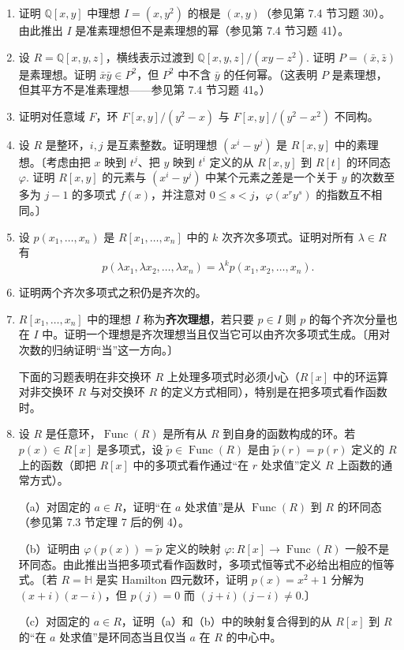 \begin{enumerate}
\item 证明 \(\mathbb{Q}[x, y]\) 中理想 \(I = (x, y^2)\) 的根是 \((x, y)\)（参见第 7.4 节习题 30）。由此推出 \(I\) 是准素理想但不是素理想的幂（参见第 7.4 节习题 41）。

\item 设 \(R = \mathbb{Q}[x, y, z]\)，横线表示过渡到 \(\mathbb{Q}[x, y, z]/(xy - z^2)\). 证明 \(P = (\bar{x}, \bar{z})\) 是素理想。证明 \(\bar{x}\bar{y} \in P^2\)，但 \(P^2\) 中不含 \(\bar{y}\) 的任何幂。（这表明 \(P\) 是素理想，但其平方不是准素理想——参见第 7.4 节习题 41。）

\item 证明对任意域 \(F\)，环 \(F[x, y]/(y^2 - x)\) 与 \(F[x, y]/(y^2 - x^2)\) 不同构。

\item 设 \(R\) 是整环，\(i, j\) 是互素整数。证明理想 \((x^i - y^j)\) 是 \(R[x, y]\) 中的素理想。〔考虑由把 \(x\) 映到 \(t^j\)、把 \(y\) 映到 \(t^i\) 定义的从 \(R[x, y]\) 到 \(R[t]\) 的环同态 \(\varphi\). 证明 \(R[x, y]\) 的元素与 \((x^i - y^j)\) 中某个元素之差是一个关于 \(y\) 的次数至多为 \(j-1\) 的多项式 \(f(x)\)，并注意对 \(0 \leq s < j\)，\(\varphi(x^r y^s)\) 的指数互不相同。〕

\item 设 \(p(x_1, \ldots, x_n)\) 是 \(R[x_1, \ldots, x_n]\) 中的 \(k\) 次齐次多项式。证明对所有 \(\lambda \in R\) 有
\[
p(\lambda x_1, \lambda x_2, \ldots, \lambda x_n) = \lambda^k p(x_1, x_2, \ldots, x_n).
\]

\item 证明两个齐次多项式之积仍是齐次的。

\item \(R[x_1, \ldots, x_n]\) 中的理想 \(I\) 称为\textbf{齐次理想}，若只要 \(p \in I\) 则 \(p\) 的每个齐次分量也在 \(I\) 中。证明一个理想是齐次理想当且仅当它可以由齐次多项式生成。〔用对次数的归纳证明“当”这一方向。〕

\noindent 下面的习题表明在非交换环 \(R\) 上处理多项式时必须小心（\(R[x]\) 中的环运算对非交换环 \(R\) 与对交换环 \(R\) 的定义方式相同），特别是在把多项式看作函数时。

\item 设 \(R\) 是任意环，\(\operatorname{Func}(R)\) 是所有从 \(R\) 到自身的函数构成的环。若 \(p(x) \in R[x]\) 是多项式，设 \(\tilde{p} \in \operatorname{Func}(R)\) 是由 \(\tilde{p}(r) = p(r)\) 定义的 \(R\) 上的函数（即把 \(R[x]\) 中的多项式看作通过“在 \(r\) 处求值”定义 \(R\) 上函数的通常方式）。

（a）对固定的 \(a \in R\)，证明“在 \(a\) 处求值”是从 \(\operatorname{Func}(R)\) 到 \(R\) 的环同态（参见第 7.3 节定理 7 后的例 4）。

（b）证明由 \(\varphi(p(x)) = \tilde{p}\) 定义的映射 \(\varphi : R[x] \to \operatorname{Func}(R)\) 一般不是环同态。由此推出当把多项式看作函数时，多项式恒等式不必给出相应的恒等式。〔若 \(R = \mathbb{H}\) 是实 Hamilton 四元数环，证明 \(p(x) = x^2+1\) 分解为 \((x+i)(x-i)\)，但 \(p(j) = 0\) 而 \((j+i)(j-i) \neq 0\).〕

（c）对固定的 \(a \in R\)，证明（a）和（b）中的映射复合得到的从 \(R[x]\) 到 \(R\) 的“在 \(a\) 处求值”是环同态当且仅当 \(a\) 在 \(R\) 的中心中。
\end{enumerate}

